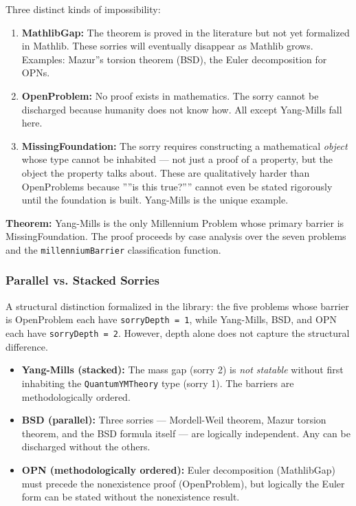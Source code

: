 \documentclass[12pt,a4paper]{article}
\begin{document}
Three distinct kinds of impossibility:

\begin{enumerate}
    \item \textbf{MathlibGap:} The theorem is proved in the literature but not yet formalized in Mathlib. These sorries will eventually disappear as Mathlib grows. Examples: Mazur''s torsion theorem (BSD), the Euler decomposition for OPNs.
    \item \textbf{OpenProblem:} No proof exists in mathematics. The sorry cannot be discharged because humanity does not know how. All except Yang-Mills fall here.
    \item \textbf{MissingFoundation:} The sorry requires constructing a mathematical \emph{object} whose type cannot be inhabited --- not just a proof of a property, but the object the property talks about. These are qualitatively harder than OpenProblems because ''''is this true?'''' cannot even be stated rigorously until the foundation is built. Yang-Mills is the unique example.
\end{enumerate}

\textbf{Theorem:} Yang-Mills is the only Millennium Problem whose primary barrier is MissingFoundation. The proof proceeds by case analysis over the seven problems and the \texttt{millenniumBarrier} classification function.

\subsubsection{Parallel vs. Stacked Sorries}

A structural distinction formalized in the library: the five problems whose barrier is OpenProblem each have \texttt{sorryDepth = 1}, while Yang-Mills, BSD, and OPN each have \texttt{sorryDepth = 2}. However, depth alone does not capture the structural difference.

\begin{itemize}
    \item \textbf{Yang-Mills (stacked):} The mass gap (sorry 2) is \emph{not statable} without first inhabiting the \texttt{QuantumYMTheory} type (sorry 1). The barriers are methodologically ordered.
    \item \textbf{BSD (parallel):} Three sorries --- Mordell-Weil theorem, Mazur torsion theorem, and the BSD formula itself --- are logically independent. Any can be discharged without the others.
    \item \textbf{OPN (methodologically ordered):} Euler decomposition (MathlibGap) must precede the nonexistence proof (OpenProblem), but logically the Euler form can be stated without the nonexistence result.
\end{itemize}
\end{document}
